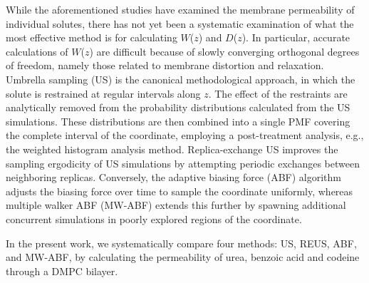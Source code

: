 \par While the aforementioned studies have examined the membrane permeability of individual solutes, there has not yet been a systematic examination of what the most effective method is for calculating $W$($z$) and $D$($z$). In particular, accurate calculations of $W$($z$) are difficult because of slowly converging orthogonal degrees of freedom, namely those related to membrane distortion and relaxation\cite{Neale2011,Neale2014}. Umbrella sampling (US) is the canonical methodological approach, in which the solute is restrained at regular intervals along $z$. The effect of the restraints are analytically removed from the probability distributions calculated from the US simulations. These distributions are then combined into a single PMF covering the complete interval of the coordinate, employing a post-treatment analysis, e.g., the weighted histogram analysis method.  Replica-exchange US improves the sampling ergodicity of US simulations by attempting periodic exchanges between neighboring replicas. Conversely, the adaptive biasing force (ABF) algorithm adjusts the biasing force over time to sample the coordinate uniformly, whereas multiple walker ABF (MW-ABF) extends this further by spawning additional concurrent simulations in poorly explored regions of the coordinate.  

\par In the present work, we systematically compare four methods: US, REUS, ABF, and MW-ABF, by calculating the permeability of urea, benzoic acid and codeine through a DMPC bilayer.
